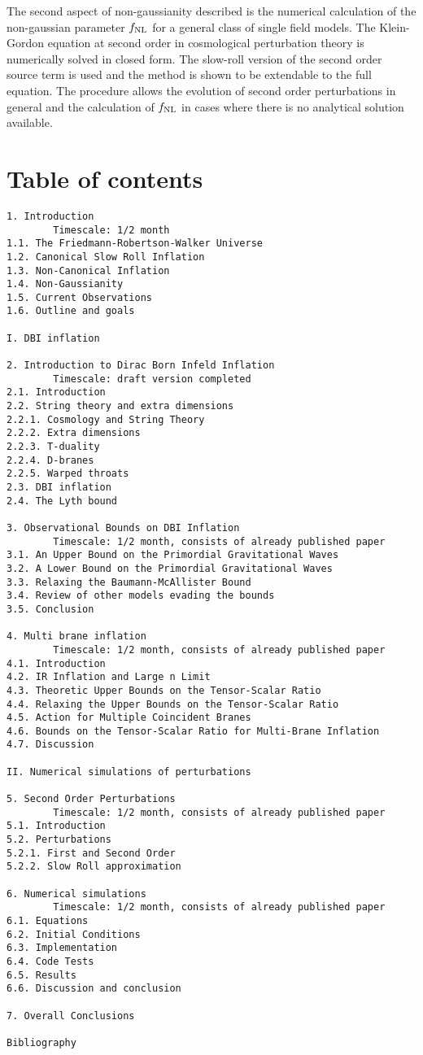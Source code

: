\documentclass[a4paper,11pt]{article}
\begin{document}
The second aspect of non-gaussianity described is the numerical calculation
of the non-gaussian parameter $f_{\mathrm{NL}}$ for a general class of single field models.
The Klein-Gordon equation at second
order in cosmological perturbation theory is numerically solved in closed form. 
The slow-roll
version of the second order source term is used and the method is
shown to be extendable to the full equation.
The procedure allows the evolution of second order
perturbations in general and the calculation of $f_{\mathrm{NL}}$ in cases
where there is no analytical solution available. 

\section*{Table of contents}
\begin{verbatim}
1. Introduction
        Timescale: 1/2 month
1.1. The Friedmann-Robertson-Walker Universe
1.2. Canonical Slow Roll Inflation
1.3. Non-Canonical Inflation
1.4. Non-Gaussianity
1.5. Current Observations
1.6. Outline and goals

I. DBI inflation

2. Introduction to Dirac Born Infeld Inflation
        Timescale: draft version completed
2.1. Introduction
2.2. String theory and extra dimensions
2.2.1. Cosmology and String Theory
2.2.2. Extra dimensions
2.2.3. T-duality
2.2.4. D-branes
2.2.5. Warped throats
2.3. DBI inflation
2.4. The Lyth bound

3. Observational Bounds on DBI Inflation
        Timescale: 1/2 month, consists of already published paper
3.1. An Upper Bound on the Primordial Gravitational Waves
3.2. A Lower Bound on the Primordial Gravitational Waves
3.3. Relaxing the Baumann-McAllister Bound
3.4. Review of other models evading the bounds 
3.5. Conclusion

4. Multi brane inflation
        Timescale: 1/2 month, consists of already published paper
4.1. Introduction
4.2. IR Inflation and Large n Limit
4.3. Theoretic Upper Bounds on the Tensor-Scalar Ratio
4.4. Relaxing the Upper Bounds on the Tensor-Scalar Ratio
4.5. Action for Multiple Coincident Branes
4.6. Bounds on the Tensor-Scalar Ratio for Multi-Brane Inflation
4.7. Discussion

II. Numerical simulations of perturbations

5. Second Order Perturbations
        Timescale: 1/2 month, consists of already published paper
5.1. Introduction
5.2. Perturbations
5.2.1. First and Second Order
5.2.2. Slow Roll approximation

6. Numerical simulations
        Timescale: 1/2 month, consists of already published paper
6.1. Equations
6.2. Initial Conditions
6.3. Implementation
6.4. Code Tests
6.5. Results
6.6. Discussion and conclusion

7. Overall Conclusions

Bibliography
\end{verbatim}
\end{document}
